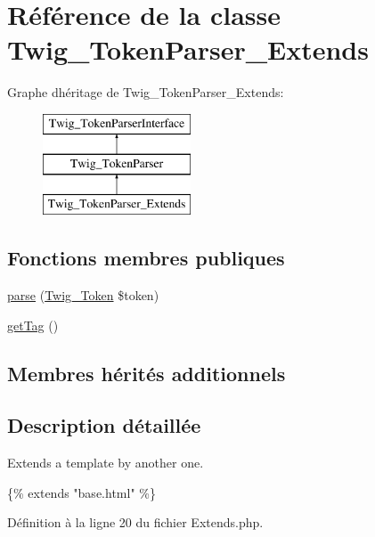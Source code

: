 \hypertarget{class_twig___token_parser___extends}{}\section{Référence de la classe Twig\+\_\+\+Token\+Parser\+\_\+\+Extends}
\label{class_twig___token_parser___extends}
Graphe d\textquotesingle{}héritage de Twig\+\_\+\+Token\+Parser\+\_\+\+Extends\+:\begin{figure}[H]
\begin{center}
\leavevmode
\includegraphics[height=3.000000cm]{class_twig___token_parser___extends}
\end{center}
\end{figure}
\subsection*{Fonctions membres publiques}
\begin{DoxyCompactItemize}
\item 
\hyperlink{class_twig___token_parser___extends_a5dfa2e269321584fb74e8b43dabe0efd}{parse} (\hyperlink{class_twig___token}{Twig\+\_\+\+Token} \$token)
\item 
\hyperlink{class_twig___token_parser___extends_ab86ba36154b20e6bbfa3ba705f12f9d6}{get\+Tag} ()
\end{DoxyCompactItemize}
\subsection*{Membres hérités additionnels}


\subsection{Description détaillée}
Extends a template by another one.


\begin{DoxyPre}
 \{\% extends "base.html" \%\}
\end{DoxyPre}
 

Définition à la ligne 20 du fichier Extends.\+php.



